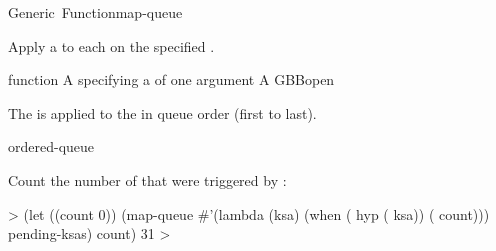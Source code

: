 \documentclass[10pt,twoside,english,pdftex]{article}
\begin{document}
\begin{functiondoc}{Generic~Function}{map-queue}{}
%
%

\fnsyntax

\fnpurpose Apply a  to each  on the
specified .

\fnmethods
{}

\fnpackage {}

\fnmodule {}

\fnargs
\begin{args}{function}
\arg[function] A  specifying a
   of one argument
\arg[queue] A GBBopen 
\end{args}

\fndescription The  is applied to the
 in queue order (first to last).

\begin{alsos}{ordered-queue}
\also[do-queue]
\also[queue]
\end{alsos}

\fnexample
{}%
%
%
Count the number of  that were triggered by
: 
%
\W\supp
\begin{example}
  > (let ((count 0))
      (map-queue #'(lambda (ksa)
                     (when ( hyp ( ksa))
                       ( count)))
                 pending-ksas)
       count)
  31
  >
\end{example}

\end{functiondoc}

\end{document}
